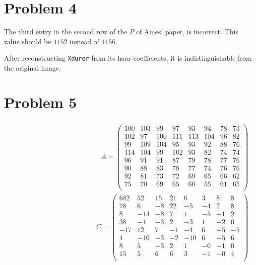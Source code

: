 \documentclass[paper=a4, fontsize=11pt]{scrartcl} %
\begin{document}
\section*{Problem 4}
The third entry in the second row of the $P$ of Ames' paper, is incorrect.
This value should be $1152$ instead of $1156$.

\bigskip
After reconstructing  \texttt{Xdurer} from its haar coefficients, it is
indistinguishable from the original image.

\section*{Problem 5}

\begin{align*}
    \begin{split}
        A =
        \begin{pmatrix}
            100 & 103 & 99  & 97  & 93  & 94  & 78 & 73\\
            102 & 97  & 100 & 111 & 113 & 104 & 96 & 82\\
            99  & 109 & 104 & 95  & 93  & 92  & 88 & 76\\
            114 & 104 & 99  & 102 & 93  & 82  & 74 & 74\\
            96  & 91  & 91  & 87  & 79  & 78  & 77 & 76\\
            90  & 88  & 83  & 78  & 77  & 74  & 76 & 76\\
            92  & 81  & 73  & 72  & 69  & 65  & 66 & 62\\
            75  & 70  & 69  & 65  & 60  & 55  & 61 & 65\\
        \end{pmatrix}
    \end{split}
    \begin{split}
        C =
        \begin{pmatrix}
            682 & 52  & 15  & 21  & 6   & 3   & 8   & 8\\
            78  & 6   & -8  & 22  & -5  & -4  & 2   & 8\\
            8   & -14 & -8  & 7   & 1   & -5  & -1  & 2\\
            38  & -1  & -3  & 2   & -3  & 1   & -2  & 0\\
            -17 & 12  & 7   & -1  & -4  & 6   & -5  & -5\\
            4   & -10 & -3  & -2  & -10 & 6   & -5  & 6\\
            8   & 5   & -3  & 2   & 1   & -0  & -1  & 0\\
            15  & 5   & 6   & 6   & 3   & -1  & -0  & 4\\
        \end{pmatrix}
    \end{split}
\end{align*}
\end{document}
